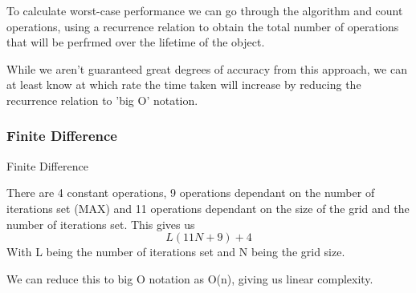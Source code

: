 \documentclass[aps,twocolumn,pre,nofootinbib,10pt]{revtex4-1}
\begin{document}
To calculate worst-case performance we can go through the algorithm and count operations, using a recurrence relation to obtain the total number of operations that will be perfrmed over the lifetime of the object.

While we aren't guaranteed great degrees of accuracy from this approach, we can at least know at which rate the time taken will increase by reducing the recurrence relation to 'big O' notation.

\subsubsection{Finite Difference}
\begin{algorithm}
    \caption{Finite Difference}
    \label{alg:fd}
    \begin{algorithmic}[1]
                    \EndIf
                    \EndIf
                \EndFor
            \EndFor
            \State {}
        \EndFunction
            \EndWhile
            \State {}
        \EndFunction
    \end{algorithmic}
\end{algorithm}

There are 4 constant operations, 9 operations dependant on the number of iterations set (MAX) and 11 operations dependant on the size of the grid and the number of iterations set. This gives us \[L(11N+9)+4\] With L being the number of iterations set and N being the grid size.

We can reduce this to big O notation as O(n), giving us linear complexity.
\end{document}
